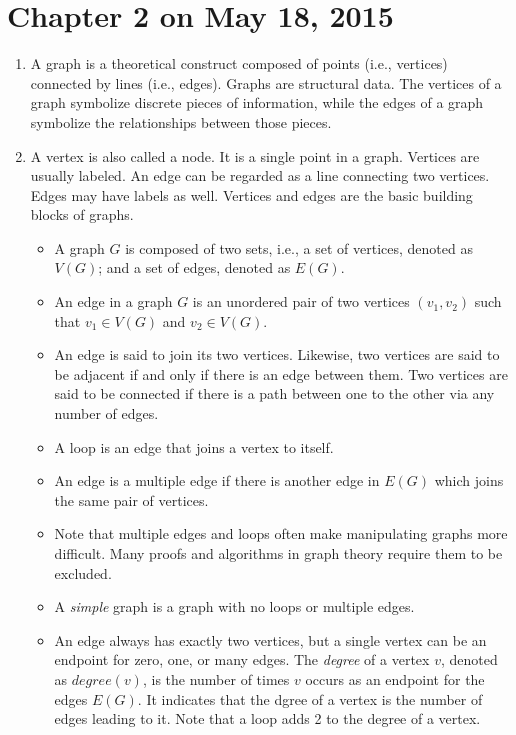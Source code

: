 \documentclass[14pt]{article}
\begin{document}
\section{Chapter 2 on May 18, 2015}
\begin{enumerate}
 \item A graph is a theoretical construct composed of points (i.e., vertices) connected by lines (i.e., edges). Graphs are structural data. The vertices of a graph symbolize discrete pieces of information, while the edges of a graph symbolize the relationships between those pieces. 
 
 \item A vertex is also called a node. It is a single point in a graph. Vertices are usually labeled. An edge can be regarded as a line connecting two vertices. Edges may have labels as well. Vertices and edges are the basic building blocks of graphs.
 \begin{itemize}
  \item A graph $G$ is composed of two sets, i.e., a set of vertices, denoted as $V(G)$; and a set of edges, denoted as $E(G)$.
  \item An edge in a graph $G$ is an unordered pair of two vertices $(v_1,v_2)$ such that $v_1 \in V(G)$ and $v_2 \in V(G)$.
  \item An edge is said to join its two vertices. Likewise, two vertices are said to be adjacent if and only if there is an edge between them. Two vertices are said to be connected if there is a path between one to the other via any number of edges.
  \item A loop is an edge that joins a vertex to itself.
  \item An edge is a multiple edge if there is another edge in $E(G)$ which joins the same pair of vertices.
  \item Note that multiple edges and loops often make manipulating graphs more difficult. Many proofs and algorithms in graph theory require them to be excluded.
  \item A \emph{simple} graph is a graph with no loops or multiple edges.
  \item An edge always has exactly two vertices, but a single vertex can be an endpoint for zero, one, or many edges. The \emph{degree} of a vertex $v$, denoted as $degree(v)$, is the number of times $v$ occurs as an endpoint for the edges $E(G)$. It indicates that the dgree of a vertex is the number of edges leading to it. Note that a loop adds 2 to the degree of a vertex.
 \end{itemize}
 

\end{enumerate}
\end{document}
